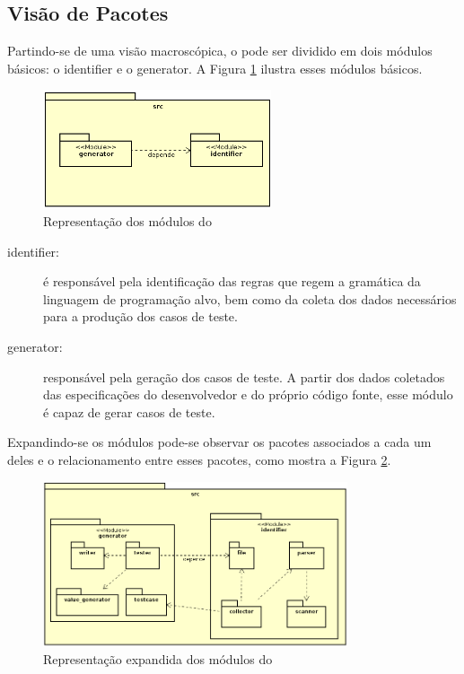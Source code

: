 \subsection{Visão de Pacotes}
Partindo-se de uma visão macroscópica, o \scarefault pode ser dividido em
dois módulos básicos: o \textsf{identifier} e o \textsf{generator}. A Figura
\ref{modules-scarefault} ilustra esses módulos básicos.

\begin{figure}[h]
  \centering
    \includegraphics[width=0.6\textwidth]{figuras/modules-scarefault.png}
    \caption{Representação dos módulos do \Scarefault}
    \label{modules-scarefault}
\end{figure}
\FloatBarrier

\begin{description}
\item[identifier:] é responsável pela identificação das regras que regem
a gramática da linguagem de programação alvo, bem como da coleta dos dados
necessários para a produção dos casos de teste.
\item[generator:] responsável pela geração dos casos de teste. A partir dos dados
coletados das especificações do desenvolvedor e do próprio código fonte, esse
módulo é capaz de gerar casos de teste.
\end{description}

Expandindo-se os módulos pode-se observar os pacotes associados a cada um deles
e o relacionamento entre esses pacotes, como mostra a Figura
\ref{expand-modules-scarefault-1}.

\begin{figure}[h]
  \centering
    \includegraphics[width=0.8\textwidth]{figuras/expand-modules-scarefault-1.png}
    \caption{Representação expandida dos módulos do \Scarefault}
    \label{expand-modules-scarefault-1}
\end{figure}

